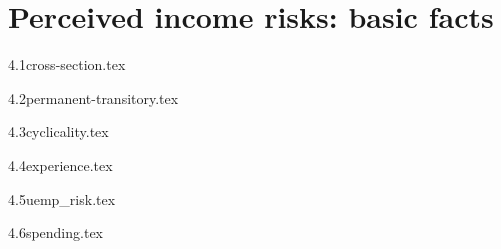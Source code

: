 \hypertarget{perceived-income-risks-basic-facts}{%
\section{Perceived income risks: basic
facts}\label{perceived-income-risks-basic-facts}}


{4.1cross-section.tex}


{4.2permanent-transitory.tex}

{4.3cyclicality.tex}

{4.4experience.tex}

{4.5uemp_risk.tex}

{4.6spending.tex}

